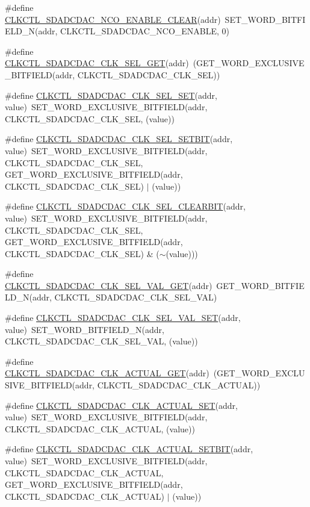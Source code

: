 \begin{DoxyCompactItemize}
\item 
\#define \hyperlink{a00544_afe83c79b8a8316f43eb71afe4801c20d}{CLKCTL\_\-SDADCDAC\_\-NCO\_\-ENABLE\_\-CLEAR}(addr)~SET\_\-WORD\_\-BITFIELD\_\-N(addr, CLKCTL\_\-SDADCDAC\_\-NCO\_\-ENABLE, 0)
\item 
\#define \hyperlink{a00544_a586bc18f6d159e76ef950e8b34fc48f0}{CLKCTL\_\-SDADCDAC\_\-CLK\_\-SEL\_\-GET}(addr)~(GET\_\-WORD\_\-EXCLUSIVE\_\-BITFIELD(addr, CLKCTL\_\-SDADCDAC\_\-CLK\_\-SEL))
\item 
\#define \hyperlink{a00544_a3f38c66a393fad3ff2093abbf219fd5c}{CLKCTL\_\-SDADCDAC\_\-CLK\_\-SEL\_\-SET}(addr, value)~SET\_\-WORD\_\-EXCLUSIVE\_\-BITFIELD(addr, CLKCTL\_\-SDADCDAC\_\-CLK\_\-SEL, (value))
\item 
\#define \hyperlink{a00544_a820223a6eca9e0427306061d7d2d11e8}{CLKCTL\_\-SDADCDAC\_\-CLK\_\-SEL\_\-SETBIT}(addr, value)~SET\_\-WORD\_\-EXCLUSIVE\_\-BITFIELD(addr, CLKCTL\_\-SDADCDAC\_\-CLK\_\-SEL, GET\_\-WORD\_\-EXCLUSIVE\_\-BITFIELD(addr, CLKCTL\_\-SDADCDAC\_\-CLK\_\-SEL) $|$ (value))
\item 
\#define \hyperlink{a00544_ad7ce36a7b7002685dc9688b0e2c34f8b}{CLKCTL\_\-SDADCDAC\_\-CLK\_\-SEL\_\-CLEARBIT}(addr, value)~SET\_\-WORD\_\-EXCLUSIVE\_\-BITFIELD(addr, CLKCTL\_\-SDADCDAC\_\-CLK\_\-SEL, GET\_\-WORD\_\-EXCLUSIVE\_\-BITFIELD(addr, CLKCTL\_\-SDADCDAC\_\-CLK\_\-SEL) \& ($\sim$(value)))
\item 
\#define \hyperlink{a00544_a17d361aea0a29fa58020342e49d5ff82}{CLKCTL\_\-SDADCDAC\_\-CLK\_\-SEL\_\-VAL\_\-GET}(addr)~GET\_\-WORD\_\-BITFIELD\_\-N(addr, CLKCTL\_\-SDADCDAC\_\-CLK\_\-SEL\_\-VAL)
\item 
\#define \hyperlink{a00544_a1f021f70596b46ca390e373e5131c56d}{CLKCTL\_\-SDADCDAC\_\-CLK\_\-SEL\_\-VAL\_\-SET}(addr, value)~SET\_\-WORD\_\-BITFIELD\_\-N(addr, CLKCTL\_\-SDADCDAC\_\-CLK\_\-SEL\_\-VAL, (value))
\item 
\#define \hyperlink{a00544_a51a4e4fdcf1f0a99ce468181e1a6ef8d}{CLKCTL\_\-SDADCDAC\_\-CLK\_\-ACTUAL\_\-GET}(addr)~(GET\_\-WORD\_\-EXCLUSIVE\_\-BITFIELD(addr, CLKCTL\_\-SDADCDAC\_\-CLK\_\-ACTUAL))
\item 
\#define \hyperlink{a00544_a6c606260344b1c87768b91b7fcf01722}{CLKCTL\_\-SDADCDAC\_\-CLK\_\-ACTUAL\_\-SET}(addr, value)~SET\_\-WORD\_\-EXCLUSIVE\_\-BITFIELD(addr, CLKCTL\_\-SDADCDAC\_\-CLK\_\-ACTUAL, (value))
\item 
\#define \hyperlink{a00544_ac0de43ac2be663110185093b5e2e66bd}{CLKCTL\_\-SDADCDAC\_\-CLK\_\-ACTUAL\_\-SETBIT}(addr, value)~SET\_\-WORD\_\-EXCLUSIVE\_\-BITFIELD(addr, CLKCTL\_\-SDADCDAC\_\-CLK\_\-ACTUAL, GET\_\-WORD\_\-EXCLUSIVE\_\-BITFIELD(addr, CLKCTL\_\-SDADCDAC\_\-CLK\_\-ACTUAL) $|$ (value))

\end{DoxyCompactItemize}
